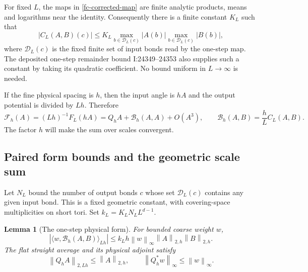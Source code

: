 \documentclass[11pt]{article}
\newtheorem{lemma}[theorem]{Lemma}
\theoremstyle{remark}
\newcommand{\norm}[1]{\left\|#1\right\|}
\begin{document}
For fixed $L$, the maps in \eqref{fc-corrected-map} are finite
analytic products, means and logarithms near the identity.
Consequently there is a finite constant $K_L$ such that
\begin{equation}
 |C_L(A,B)(c)|\le K_L
       \max_{b\in\mathcal D_L(c)}|A(b)|
       \max_{b\in\mathcal D_L(c)}|B(b)|,
 \label{fc-one-step-coefficient}
\end{equation}
where $\mathcal D_L(c)$ is the fixed finite set of input bonds read
by the one-step map. The deposited one-step remainder bound
I:24349--24353 also supplies such a constant by taking its quadratic
coefficient. No bound uniform in $L\to\infty$ is needed.

If the fine physical spacing is $h$, then the input angle is $hA$
and the output potential is divided by $Lh$. Therefore
\begin{equation}
 \mathcal F_h(A)=(Lh)^{-1}F_L(hA)
    =Q_hA+\mathcal B_h(A,A)+O(A^3),
 \qquad \mathcal B_h(A,B)=\frac hL C_L(A,B).
 \label{fc-physical-jet}
\end{equation}
The factor $h$ will make the sum over scales convergent.

\subsection{Paired form bounds and the geometric scale sum}
\label{fc-geometric-section}

Let $N_L$ bound the number of output bonds $c$ whose set
$\mathcal D_L(c)$ contains any given input bond. This is a fixed
geometric constant, with covering-space multiplicities on short
tori. Set $k_L=K_LN_LL^{d-1}$.

\begin{lemma}[The one-step physical form]
\label{fc-one-step-form}
For bounded coarse weight $w$,
\begin{equation}
 |\langle w,\mathcal B_h(A,B)\rangle_{Lh}|
 \le k_Lh\norm{w}_\infty\norm{A}_{2,h}\norm{B}_{2,h}.
 \label{fc-one-step-form-bound}
\end{equation}
The flat straight average and its physical adjoint satisfy
\begin{equation}
 \norm{Q_hA}_{2,Lh}\le\norm{A}_{2,h},\qquad
 \norm{Q_h^*w}_\infty\le\norm{w}_\infty.
 \label{fc-contractions}
\end{equation}
\end{lemma}
\end{document}
